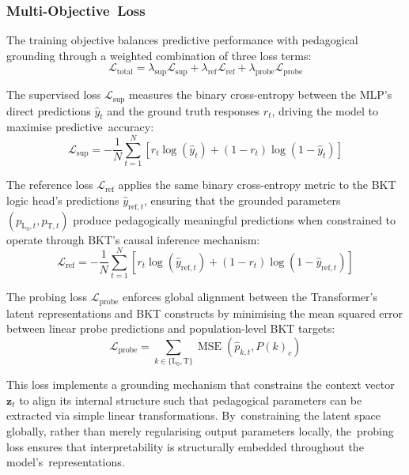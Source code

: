 \documentclass[applsci,article,accept,moreauthors,pdftex]{Definitions/mdpi}
\begin{document}
\subsubsection{Multi-Objective~Loss} \label{sec_loss}

The training objective balances predictive performance with pedagogical grounding through a weighted combination of three loss terms:
\begin{equation} \label{eq:total_loss}
    \mathcal{L}_{\text{total}} = \lambda_{\text{sup}} \mathcal{L}_{\text{sup}} + \lambda_{\text{ref}} \mathcal{L}_{\text{ref}} + \lambda_{\text{probe}} \mathcal{L}_{\text{probe}}
\end{equation}

The supervised loss $\mathcal{L}_{\text{sup}}$ measures the binary cross-entropy between the MLP's direct predictions $\hat{y}_t$ and the ground truth responses $r_t$, driving the model to {maximise} predictive~accuracy:
\begin{equation}
    \mathcal{L}_{\text{sup}} = -\frac{1}{N} \sum_{t=1}^N \left[ r_t \log(\hat{y}_t) + (1-r_t) \log(1-\hat{y}_t) \right]
\end{equation}

The reference loss $\mathcal{L}_{\text{ref}}$ applies the same binary cross-entropy metric to the BKT logic head's predictions $\hat{y}_{\text{ref},t}$, ensuring that the grounded parameters $(p_{\text{L}_0,t}, p_{\text{T},t})$ produce pedagogically meaningful predictions when constrained to operate through BKT's causal inference mechanism:
\begin{equation}
    \mathcal{L}_{\text{ref}} = -\frac{1}{N} \sum_{t=1}^N \left[ r_t \log(\hat{y}_{\text{ref},t}) + (1-r_t) \log(1-\hat{y}_{\text{ref},t}) \right]
\end{equation}

The probing loss $\mathcal{L}_{\text{probe}}$ enforces global alignment between the Transformer's latent representations and BKT constructs by {minimising} the mean squared error between linear probe predictions and population-level BKT targets:
\begin{equation}
    \mathcal{L}_{\text{probe}} = \sum_{k \in \{\text{L}_0, \text{T}\}} \operatorname{MSE}\left( \hat{p}_{k,t}, P(k)_c \right)
\end{equation}

This loss implements a grounding mechanism that constrains the context vector $\mathbf{z}_t$ to align its internal structure such that pedagogical parameters can be extracted via simple linear transformations. By~constraining the latent space globally, rather than merely {regularising} output parameters locally, the~probing loss ensures that interpretability is structurally embedded throughout the model's~representations.
\end{document}
